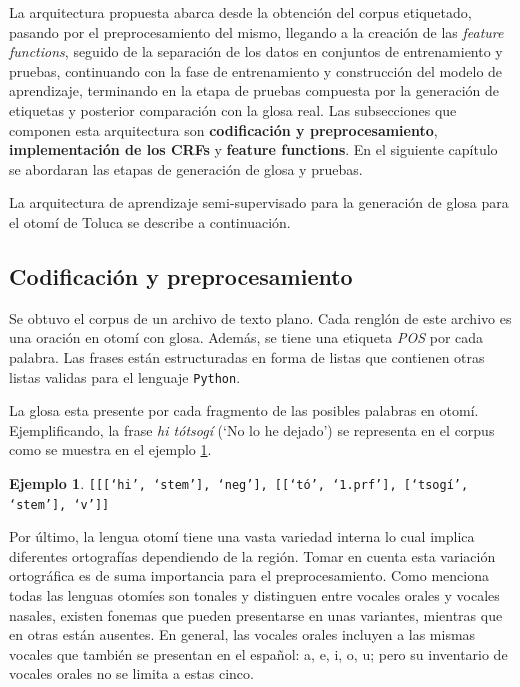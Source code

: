 \documentclass[letterpaper,12pt,oneside]{book}
\newcommand{\note}[4][]{\todo[author=#2,color=#3,size=\scriptsize,fancyline,caption={},#1]{#4}} %
\newcommand{\diego}[2][]{\note[#1]{Diego}{blue!40}{#2}}
\newcommand{\Diego}[2][]{\diego[inline,#1]{#2}\noindent}
\def\code#1{\texttt{#1}}
\theoremstyle{definition}
\newtheorem{exmp}{Ejemplo}[section]
\begin{document}
La arquitectura propuesta abarca desde la obtención del corpus etiquetado, pasando por el preprocesamiento del mismo, llegando a la creación de las \textit{feature functions}, seguido de la separación de los datos en conjuntos de entrenamiento y pruebas, continuando con la fase de entrenamiento y construcción del modelo de aprendizaje, terminando en la etapa de pruebas compuesta por la generación de etiquetas y posterior comparación con la glosa real. Las subsecciones que componen esta arquitectura son \textbf{codificación y preprocesamiento}, \textbf{implementación de los CRFs} y \textbf{feature functions}. En el siguiente capítulo se abordaran las etapas de generación de glosa y pruebas.

La arquitectura de aprendizaje semi-supervisado para la generación de glosa para el otomí de Toluca se describe a continuación.

\subsection{Codificación y preprocesamiento}

Se obtuvo el corpus de un archivo de texto plano. Cada renglón de este archivo es una oración en otomí con glosa. Además, se tiene una etiqueta \textit{POS} por cada palabra. Las frases están estructuradas en forma de listas que contienen otras listas validas para el lenguaje \code{Python}.

La glosa esta presente por cada fragmento de las posibles palabras en otomí. Ejemplificando, la frase \textit{hi tótsogí} (`No lo he dejado') se representa en el corpus como se muestra en el ejemplo \ref{exmp:frase_glosada}.

\begin{exmp} \label{exmp:frase_glosada}
    \code{[[[`hi', `stem'], `neg'],
    [[`tó', `1.prf'],
    [`tsogí', `stem'], `v']]}
\end{exmp}
\Diego{Corrección del margen}

Por último, la lengua otomí tiene una vasta variedad interna lo cual implica diferentes ortografías dependiendo de la región. Tomar en cuenta esta variación ortográfica es de suma importancia para el preprocesamiento. Como menciona \cite{elotl2019otomiprepro} todas las lenguas otomíes son tonales y distinguen entre vocales orales y vocales nasales, existen fonemas que pueden presentarse en unas variantes, mientras que en otras están ausentes. En general, las vocales orales incluyen a las mismas vocales que también se presentan en el español: a, e, i, o, u; pero su inventario de vocales orales no se limita a estas cinco.
\end{document}
